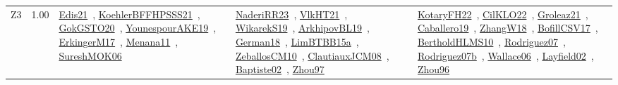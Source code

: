 {\begin{longtable}{p{3cm}r>{\raggedright\arraybackslash}p{6cm}>{\raggedright\arraybackslash}p{6cm}>{\raggedright\arraybackslash}p{8cm}}
\index{Z3}\index{CPSystems!Z3}Z3 &  1.00 & \href{../works/Edis21.pdf}{Edis21}~\cite{Edis21}, \href{../works/KoehlerBFFHPSSS21.pdf}{KoehlerBFFHPSSS21}~\cite{KoehlerBFFHPSSS21}, \href{../works/GokGSTO20.pdf}{GokGSTO20}~\cite{GokGSTO20}, \href{../works/YounespourAKE19.pdf}{YounespourAKE19}~\cite{YounespourAKE19}, \href{../works/ErkingerM17.pdf}{ErkingerM17}~\cite{ErkingerM17}, \href{../works/Menana11.pdf}{Menana11}~\cite{Menana11}, \href{../works/SureshMOK06.pdf}{SureshMOK06}~\cite{SureshMOK06} & \href{../works/NaderiRR23.pdf}{NaderiRR23}~\cite{NaderiRR23}, \href{../works/VlkHT21.pdf}{VlkHT21}~\cite{VlkHT21}, \href{../works/WikarekS19.pdf}{WikarekS19}~\cite{WikarekS19}, \href{../works/ArkhipovBL19.pdf}{ArkhipovBL19}~\cite{ArkhipovBL19}, \href{../works/German18.pdf}{German18}~\cite{German18}, \href{../works/LimBTBB15a.pdf}{LimBTBB15a}~\cite{LimBTBB15a}, \href{../works/ZeballosCM10.pdf}{ZeballosCM10}~\cite{ZeballosCM10}, \href{../works/ClautiauxJCM08.pdf}{ClautiauxJCM08}~\cite{ClautiauxJCM08}, \href{../works/Baptiste02.pdf}{Baptiste02}~\cite{Baptiste02}, \href{../works/Zhou97.pdf}{Zhou97}~\cite{Zhou97} & \href{../works/KotaryFH22.pdf}{KotaryFH22}~\cite{KotaryFH22}, \href{../works/CilKLO22.pdf}{CilKLO22}~\cite{CilKLO22}, \href{../works/Groleaz21.pdf}{Groleaz21}~\cite{Groleaz21}, \href{../works/Caballero19.pdf}{Caballero19}~\cite{Caballero19}, \href{../works/ZhangW18.pdf}{ZhangW18}~\cite{ZhangW18}, \href{../works/BofillCSV17.pdf}{BofillCSV17}~\cite{BofillCSV17}, \href{../works/BertholdHLMS10.pdf}{BertholdHLMS10}~\cite{BertholdHLMS10}, \href{../works/Rodriguez07.pdf}{Rodriguez07}~\cite{Rodriguez07}, \href{../works/Rodriguez07b.pdf}{Rodriguez07b}~\cite{Rodriguez07b}, \href{../works/Wallace06.pdf}{Wallace06}~\cite{Wallace06}, \href{../works/Layfield02.pdf}{Layfield02}~\cite{Layfield02}, \href{../works/Zhou96.pdf}{Zhou96}~\cite{Zhou96}\\
\end{longtable}
}

\clearpage
